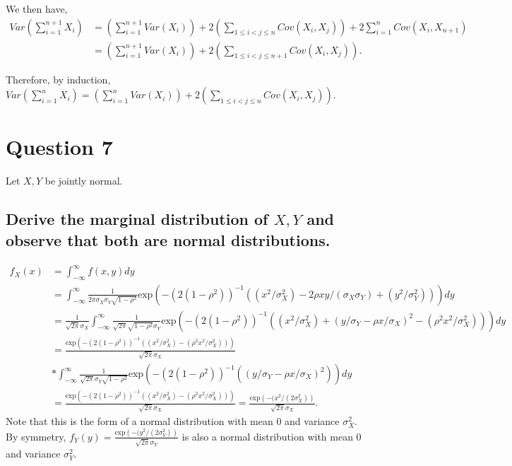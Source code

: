 \documentclass[11pt]{article} %
\begin{document}
We then have,
\begin{align*}
Var\left( \sum_{i=1}^{n+1}X_i\right) &= \left( \sum_{i=1}^{n+1} Var(X_i)\right) +  2\left( \sum_{1\leq i < j \leq n} Cov(X_i,X_j)\right) + 2\sum_{i=1}^{n}Cov\left( X_i,X_{n+1}\right)\\
&=  \left( \sum_{i=1}^{n+1} Var(X_i)\right) +  2\left( \sum_{1\leq i < j \leq n+1} Cov(X_i,X_j)\right).
\end{align*}

Therefore, by induction, $Var\left( \sum_{i=1}^{n}X_i\right) =  \left( \sum_{i=1}^{n} Var(X_i)\right) +  2\left( \sum_{1\leq i < j \leq n} Cov(X_i,X_j)\right)$.

\section{Question 7}
Let $X,Y$ be jointly normal.
\subsection{Derive the marginal distribution of $X,Y$ and observe that both are normal distributions.}
\begin{align*}
f_X(x) &= \int_{-\infty}^{\infty}f(x,y)dy \\ &=\int_{-\infty}^{\infty}\frac{1}{2\pi\sigma_X\sigma_Y\sqrt{1-\rho^2}}\text{exp}\left( -(2(1-\rho^2))^{-1}((x^2/\sigma_X^2) - 2\rho xy/(\sigma_X\sigma_Y) + (y^2/\sigma_Y^2))\right) dy \\
&= \frac{1}{\sqrt{2\pi}\sigma_X}\int_{-\infty}^{\infty}\frac{1}{\sqrt{2\pi}\sqrt{1-\rho^2}\sigma_Y}\text{exp}\left( -(2(1-\rho^2))^{-1}((x^2/\sigma_X^2) + (y/\sigma_Y - \rho x/\sigma_X)^2 - (\rho^2x^2/\sigma_X^2))\right) dy \\
&= \frac{\text{exp}\left(  -(2(1-\rho^2))^{-1}((x^2/\sigma_X^2) -  (\rho^2x^2/\sigma_X^2))\right)}{\sqrt{2\pi}\sigma_X} \\
&*\int_{-\infty}^{\infty}\frac{1}{\sqrt{2\pi}\sigma_Y\sqrt{1-\rho^2}}\text{exp}\left( -(2(1-\rho^2))^{-1}( (y/\sigma_Y - \rho x/\sigma_X)^2 )\right) dy\\
&= \frac{\text{exp}\left(  -(2(1-\rho^2))^{-1}((x^2/\sigma_X^2) -  (\rho^2x^2/\sigma_X^2))\right)}{\sqrt{2\pi}\sigma_X} = \frac{\text{exp}\left(  -(x^2/(2\sigma_X^2)\right)}{\sqrt{2\pi}\sigma_X}  .
\end{align*}
Note that this is the form of a normal distribution with mean $0$ and variance $\sigma_X^2$. By symmetry, $f_{Y}(y) =  \frac{\text{exp}\left(  -(y^2/(2\sigma_Y^2)\right)}{\sqrt{2\pi}\sigma_Y} $ is also a normal distribution with mean 0 and variance $\sigma_Y^2.$
\end{document}
